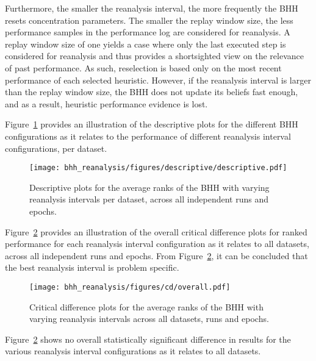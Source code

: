 Furthermore, the smaller the reanalysis interval, the more frequently the \acs{BHH} resets concentration parameters. The smaller the replay window size, the less performance samples in the performance log are considered for reanalysis. A replay window size of one yields a case where only the last executed step is considered for reanalysis and thus provides a shortsighted view on the relevance of past performance. As such, reselection is based only on the most recent performance of each selected heuristic. However, if the reanalysis interval is larger than the replay window size, the \acs{BHH} does not update its beliefs fast enough, and as a result, heuristic performance evidence is lost.

Figure~\ref{fig:results:reanalysis:descriptive:descriptive} provides an illustration of the descriptive plots for the different \acs{BHH} configurations as it relates to the performance of different reanalysis interval configurations, per dataset.

\begin{figure}[htb]
	\centering
	\texttt{[image: bhh\_reanalysis/figures/descriptive/descriptive.pdf]}
	\caption{Descriptive plots for the average ranks of the \acs{BHH} with varying reanalysis intervals per dataset, across all independent runs and epochs.}
	\label{fig:results:reanalysis:descriptive:descriptive}
\end{figure}

Figure~\ref{fig:results:reanalysis:descriptive:cd} provides an illustration of the overall critical difference plots for ranked performance for each reanalysis interval configuration as it relates to all datasets, across all independent runs and epochs. From Figure~\ref{fig:results:reanalysis:descriptive:cd}, it can be concluded that the best reanalysis interval is problem specific.

\begin{figure}[htb]
	\centering
	\texttt{[image: bhh\_reanalysis/figures/cd/overall.pdf]}
	\caption{Critical difference plots for the average ranks of the \acs{BHH} with varying reanalysis intervals across all datasets, runs and epochs.}
	\label{fig:results:reanalysis:descriptive:cd}
\end{figure}

Figure~\ref{fig:results:reanalysis:descriptive:cd} shows no overall statistically significant difference in results for the various reanalysis interval configurations as it relates to all datasets.

